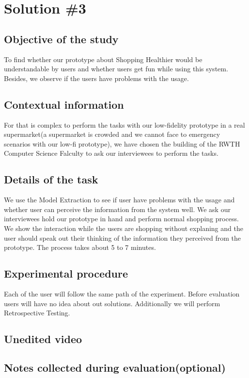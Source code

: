 \section{Solution \#3}

\subsection{Objective of the study}
To find whether our prototype about Shopping Healthier would be understandable by users and whether users get fun while using this system. Besides, we observe if the users have problems with the usage.

\subsection{Contextual information}
For that is complex to perform the tasks with our low-fidelity prototype in a real supermarket(a supermarket is crowded and we cannot face to emergency scenarios with our low-fi prototype), we have chosen the building of the RWTH Computer Science Falculty to ask our interviewees to perform the tasks.

\subsection{Details of the task}
We use the Model Extraction to see if user have problems with the usage and whether user can  perceive the information from the system well. We ask our interviewees hold our prototype in hand and perform normal shopping process. We show the interaction while the users are shopping without explaning and the user should speak out their thinking of the information they perceived from the prototype. The process takes about 5 to 7 minutes.

\subsection{Experimental procedure}
Each of the user will follow the same path of the experiment. Before evaluation users will have no idea about out solutions. Additionally we will perform Retrospective Testing.

\subsection{Unedited video}

\subsection{Notes collected during evaluation(optional)}

